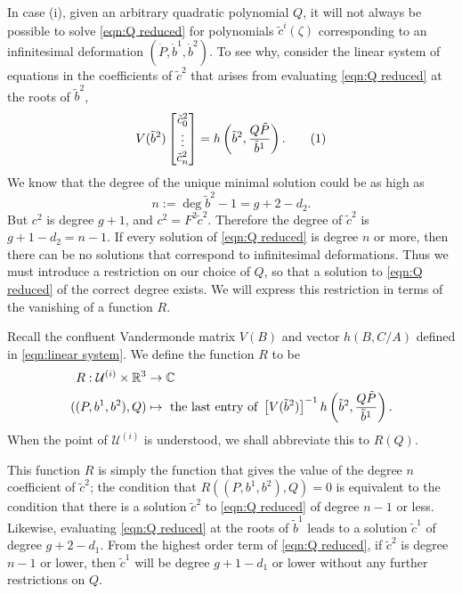 In case (i), given an arbitrary quadratic polynomial $Q$, it will not always be possible to solve \eqref{eqn:Q reduced} for polynomials $\tilde{c}^i(ζ)$ corresponding to an infinitesimal deformation $(\dot{P},\dot{b}^1,\dot{b}^2)$. To see why, consider the linear system of equations in the coefficients of $\tilde{c}^2$ that arises from evaluating \eqref{eqn:Q reduced} at the roots of $\tilde{b}^2$,
\[
V(\tilde{b}^2)
\begin{bmatrix}
\tilde{c}^2_0 \\ \vdots \\ \tilde{c}^2_n
\end{bmatrix}
=
h\bra{\tilde{b}^2, \frac{Q\tilde{P}}{\tilde{b}^1} }.
\labelthis{eqn:Q reduced linear}
\]
We know that the degree of the unique minimal solution could be as high as
\[
n := \deg \tilde{b}^2 - 1 = g + 2 - d_2.
\]
But $c^2$ is degree $g+1$, and $c^2 = F^2\tilde{c}^2$. Therefore the degree of $\tilde{c}^2$ is $g + 1 - d_2 = n-1$. If every solution of \eqref{eqn:Q reduced} is degree $n$ or more, then there can be no solutions that correspond to infinitesimal deformations. Thus we must introduce a restriction on our choice of $Q$, so that a solution to \eqref{eqn:Q reduced} of the correct degree exists. We will express this restriction in terms of the vanishing of a function $R$.

\begin{defn}
\label{def:def R}
Recall the confluent Vandermonde matrix $V(B)$ and vector $h(B,C/A)$ defined in \eqref{eqn:linear system}. We define the function $R$ to be
\begin{align*}
R : \mathcal{U}^{(i)} \times \R^3 &\to \C \\
((P,b^1,b^2), Q) &\mapsto \text{ the last entry of } \left[V( \tilde{b}^2 )\right]^{-1}
h\bra{\tilde{b}^2, \frac{Q\tilde{P}}{\tilde{b}^1} }.
\end{align*}
When the point of $\mathcal{U}^{(i)}$ is understood, we shall abbreviate this to $R(Q)$.
\end{defn}

This function $R$ is simply the function that gives the value of the degree $n$ coefficient of $\tilde{c}^2$; the condition that $R((P,b^1,b^2),Q) = 0$ is equivalent to the condition that there is a solution $\tilde{c}^2$ to \eqref{eqn:Q reduced} of degree $n-1$ or less.
Likewise, evaluating \eqref{eqn:Q reduced} at the roots of $\tilde{b}^1$ leads to a solution $\tilde{c}^1$ of degree $g+2 - d_1$. From the highest order term of \eqref{eqn:Q reduced}, if $\tilde{c}^2$ is degree $n-1$ or lower, then $\tilde{c}^1$ will be degree $g + 1 - d_1$ or lower without any further restrictions on $Q$.

